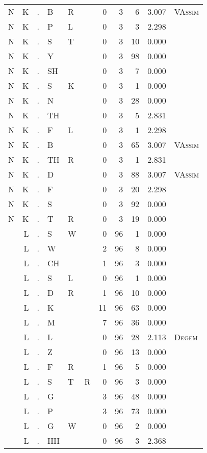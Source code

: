 \begin{longtable}{r@{ } r@{ } c@{ } l@{ } l@{ } l@{ } r r r r l }
N & K & . & B & R &  & 0 & 3 & 6 & 3.007 & \textsc{VAssim} \\
N & K & . & P & L &  & 0 & 3 & 3 & 2.298 &  \\
N & K & . & S & T &  & 0 & 3 & 10 & 0.000 &  \\
N & K & . & Y &  &  & 0 & 3 & 98 & 0.000 &  \\
N & K & . & SH &  &  & 0 & 3 & 7 & 0.000 &  \\
N & K & . & S & K &  & 0 & 3 & 1 & 0.000 &  \\
N & K & . & N &  &  & 0 & 3 & 28 & 0.000 &  \\
N & K & . & TH &  &  & 0 & 3 & 5 & 2.831 &  \\
N & K & . & F & L &  & 0 & 3 & 1 & 2.298 &  \\
N & K & . & B &  &  & 0 & 3 & 65 & 3.007 & \textsc{VAssim} \\
N & K & . & TH & R &  & 0 & 3 & 1 & 2.831 &  \\
N & K & . & D &  &  & 0 & 3 & 88 & 3.007 & \textsc{VAssim} \\
N & K & . & F &  &  & 0 & 3 & 20 & 2.298 &  \\
N & K & . & S &  &  & 0 & 3 & 92 & 0.000 &  \\
N & K & . & T & R &  & 0 & 3 & 19 & 0.000 &  \\
 & L & . & S & W &  & 0 & 96 & 1 & 0.000 &  \\
 & L & . & W &  &  & 2 & 96 & 8 & 0.000 &  \\
 & L & . & CH &  &  & 1 & 96 & 3 & 0.000 &  \\
 & L & . & S & L &  & 0 & 96 & 1 & 0.000 &  \\
 & L & . & D & R &  & 1 & 96 & 10 & 0.000 &  \\
 & L & . & K &  &  & 11 & 96 & 63 & 0.000 &  \\
 & L & . & M &  &  & 7 & 96 & 36 & 0.000 &  \\
 & L & . & L &  &  & 0 & 96 & 28 & 2.113 & \textsc{Degem} \\
 & L & . & Z &  &  & 0 & 96 & 13 & 0.000 &  \\
 & L & . & F & R &  & 1 & 96 & 5 & 0.000 &  \\
 & L & . & S & T & R & 0 & 96 & 3 & 0.000 &  \\
 & L & . & G &  &  & 3 & 96 & 48 & 0.000 &  \\
 & L & . & P &  &  & 3 & 96 & 73 & 0.000 &  \\
 & L & . & G & W &  & 0 & 96 & 2 & 0.000 &  \\
 & L & . & HH &  &  & 0 & 96 & 3 & 2.368 &  \\

\end{longtable}
